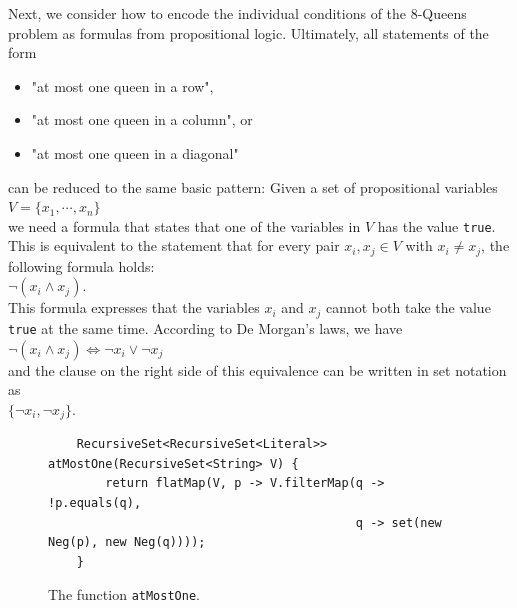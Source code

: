 Next, we consider how to encode the individual conditions of the 8-Queens problem as formulas from
propositional logic. Ultimately, all statements of the form 
\begin{itemize}
\item "at most one queen in a row",
\item "at most one queen in a column", or
\item "at most one queen in a diagonal"
\end{itemize}
can be reduced to the same basic pattern:
Given a set of propositional variables \\[0.2cm]
\hspace*{1.3cm} $V = \{ x_1, \cdots, x_n \}$ \\[0.2cm]
we need a formula that states that  one of the variables in
$V$ has the value \texttt{true}. This is equivalent to the statement that for every pair
$x_i, x_j \in V$ with $x_i \neq x_j$, the following formula holds: \\[0.2cm]
\hspace*{1.3cm} $\neg (x_i \wedge x_j)$. \\[0.2cm]
This formula expresses that the variables $x_i$ and $x_j$ cannot both take the value
\texttt{true} at the same time. According to De Morgan's laws, we have
\\[0.2cm]
\hspace*{1.3cm}
$\neg (x_i \wedge x_j) \Leftrightarrow \neg x_i \vee \neg x_j$
\\[0.2cm]
and the clause on the right side of this equivalence can be written in set notation as
\\[0.2cm]
\hspace*{1.3cm}  $\{\neg x_i, \neg x_j \}$. 

\begin{figure}[!ht]
  \centering
\begin{verbatim}
    RecursiveSet<RecursiveSet<Literal>> atMostOne(RecursiveSet<String> V) {
        return flatMap(V, p -> V.filterMap(q -> !p.equals(q),
                                           q -> set(new Neg(p), new Neg(q))));
    }
\end{verbatim}
\vspace*{-0.3cm}
  \caption{The function \texttt{atMostOne}.}
  \label{fig:atMostOne}
\end{figure}

